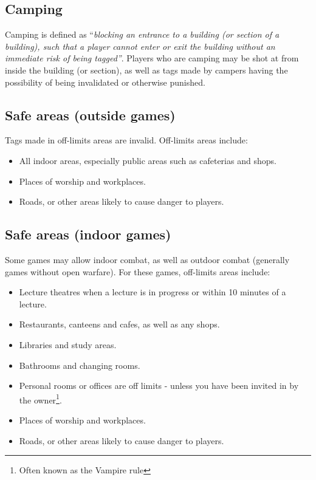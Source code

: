 \documentclass{report}
\begin{document}
	\subsection{Camping}

	Camping is defined as ``{\em blocking an entrance to a building (or section of a building), such that a player cannot enter or exit the building without an immediate risk of being tagged''}. Players who are camping may be shot at from inside the building (or section), as well as tags made by campers having the possibility of being invalidated or otherwise punished.
	
	\subsection{Safe areas (outside games)}

	Tags made in off-limits areas are invalid. Off-limits areas include:
	
	\begin{itemize}
		\item All indoor areas, especially public areas such as cafeterias and shops.
		
		\item Places of worship and workplaces.
		\item Roads, or other areas likely to cause danger to players.
	\end{itemize}
	
	\subsection{Safe areas (indoor games)}

	Some games may allow indoor combat, as well as outdoor combat (generally games without open warfare). For these games, off-limits areas include:

	\begin{itemize}
		\item Lecture theatres when a lecture is in progress or within 10 minutes of a lecture.
		\item Restaurants, canteens and cafes, as well as any shops.
		\item Libraries and study areas.
		\item Bathrooms and changing rooms.
		\item Personal rooms or offices are off limits - unless you have been invited in by the owner\footnote{Often known as the Vampire rule}.
		\item Places of worship and workplaces.
		\item Roads, or other areas likely to cause danger to players.
    \end{itemize}
\end{document}
